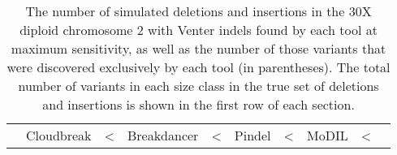 \begin{table}[t]
\begin{center}
\begin{tabular}{r|rrrr|rrrrr}
\cline{2-10}
&  Cloudbreak   &<%
&  Breakdancer & <%
&  Pindel          & <%
&  MoDIL          & <%
\hline
\end{tabular}
\end{center}
\caption{The number of simulated deletions and insertions in the 30X diploid chromosome 2 with Venter indels found by each tool at maximum sensitivity, as well as the number of those variants that were discovered exclusively by each tool (in parentheses). The total number of variants in each size class in the true set of deletions and insertions is shown in the first row of each section.}
\label{chr2DeletionAndInsertionPredsMaxSensitivity}
\end{table}
